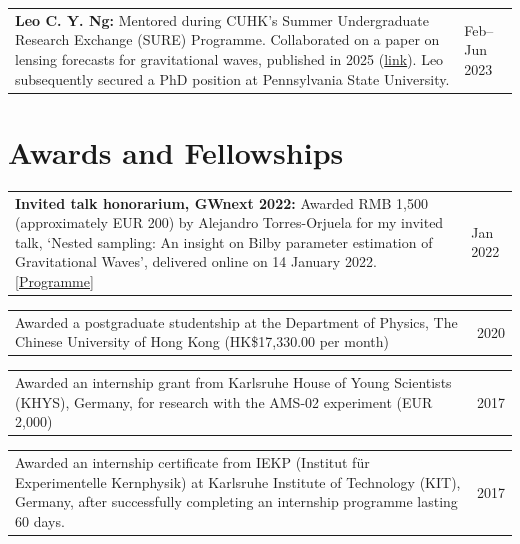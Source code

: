 \documentclass[margin,line]{res}
\begin{document}
\begin{resume}
\begin{tabular}{@{}p{\dimexpr\linewidth-0.62in-3\tabcolsep\relax}p{0.62in}}
\textbf{Leo C. Y. Ng:} Mentored during CUHK's Summer Undergraduate Research Exchange (SURE) Programme. Collaborated on a paper on lensing forecasts for gravitational waves, published in 2025 (\href{https://arxiv.org/abs/2403.16532}{link}). Leo subsequently secured a PhD position at Pennsylvania State University. & \raggedright Feb--Jun 2023
\end{tabular}

\vspace{.2in}
\section{\sc Awards and Fellowships}

\begin{tabular}{@{}p{\dimexpr\linewidth-0.62in-3\tabcolsep\relax}p{0.62in}}
\textbf{Invited talk honorarium, GWnext 2022:} Awarded RMB 1,500 (approximately EUR 200) by Alejandro Torres-Orjuela for my invited talk, `Nested sampling: An insight on Bilby parameter estimation of Gravitational Waves', delivered online on 14 January 2022. \href{https://aletorreso.wixsite.com/atogw/gwnext2022}{[Programme]} & \raggedright Jan 2022
\end{tabular}

\begin{tabular}{@{}p{\dimexpr\linewidth-0.62in-3\tabcolsep\relax}p{0.62in}}
Awarded a postgraduate studentship at the Department of Physics, The Chinese University of Hong Kong (HK\$17,330.00 per month) & \raggedright 2020
\end{tabular}

\begin{tabular}{@{}p{\dimexpr\linewidth-0.62in-3\tabcolsep\relax}p{0.62in}}
Awarded an internship grant from Karlsruhe House of Young Scientists (KHYS), Germany, for research with the AMS-02 experiment (EUR 2,000) & \raggedright 2017
\end{tabular}

\begin{tabular}{@{}p{\dimexpr\linewidth-0.62in-3\tabcolsep\relax}p{0.62in}}
Awarded an internship certificate from IEKP (Institut f\"ur Experimentelle Kernphysik) at Karlsruhe Institute of Technology (KIT), Germany, after successfully completing an internship programme lasting 60 days. & \raggedright 2017
\end{tabular}


\end{resume}
\end{document}
